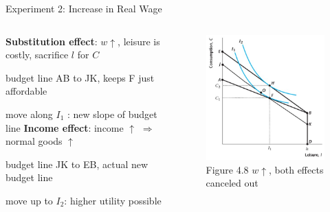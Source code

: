 \documentclass[11pt,aspectratio=169,usenames,dvipsnames]{beamer}
\let\tempone\itemize
\let\temptwo\enditemize
\renewenvironment{itemize}{\tempone\addtolength{\itemsep}{\fill}}{\temptwo}
\begin{document}
\begin{frame}{Experiment 2: Increase in Real Wage}
\label{slide:Experiment_2__Increase_in_Real_Wage}

    \begin{columns}
        \begin{column}{0.5\textwidth}
            \textbf{Substitution effect}: $ w \uparrow  $, leisure is costly, sacrifice $ l $ for $ C $
            \begin{itemize}
                \item budget line AB to JK, keeps F just affordable
                \item move along $ I_{1} $ : new slope of budget line
            \end{itemize}
            \textbf{Income effect}: income $ \uparrow  $ $ \Rightarrow  $ normal goods $ \uparrow  $
            \begin{itemize}
                \item budget line JK to EB, actual new budget line
                \item move up to $ I_{2} $: higher utility possible
            \end{itemize}
        \end{column}
        \begin{column}{0.5\textwidth}
            \begin{figure}
                \caption{Figure 4.8  $w \uparrow $, both effects canceled out}
                \includegraphics[width=.8\textwidth]{./figures/Figure4_8.jpg}
            \end{figure}
        \end{column}
    \end{columns}

\end{frame}
\end{document}
